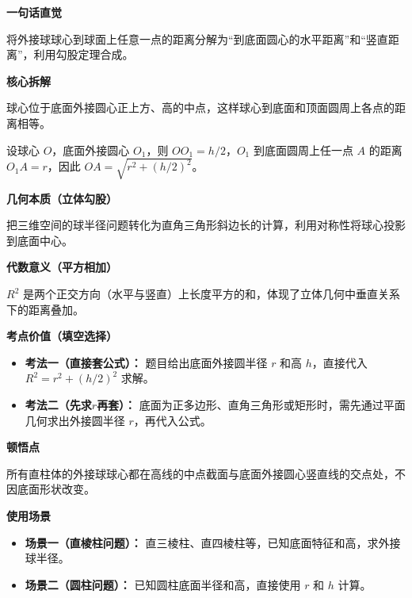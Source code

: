 \begin{explanationbox}
	\textbf{\textcolor{CExplanation}{一句话直觉}}

	将外接球球心到球面上任意一点的距离分解为“到底面圆心的水平距离”和“竖直距离”，利用勾股定理合成。

	\medskip
	\textbf{\textcolor{CExplanation}{核心拆解}}
	\begin{description}[style=nextline, leftmargin=2.8em, labelsep=0.5em, itemsep=0.45em]
		\item[\textbf{要点一（球心定位）：}] 球心位于底面外接圆心正上方、高的中点，这样球心到底面和顶面圆周上各点的距离相等。
		\item[\textbf{要点二（勾股分解）：}] 设球心 $O$，底面外接圆心 $O_1$，则 $OO_1 = h/2$，$O_1$ 到底面圆周上任一点 $A$ 的距离 $O_1 A = r$，因此 $OA = \sqrt{r^2 + (h/2)^2}$。
	\end{description}

	\medskip
	\textbf{\textcolor{CExplanation}{几何本质（立体勾股）}}

	把三维空间的球半径问题转化为直角三角形斜边长的计算，利用对称性将球心投影到底面中心。

	\medskip
	\textbf{\textcolor{CExplanation}{代数意义（平方相加）}}

	$R^2$ 是两个正交方向（水平与竖直）上长度平方的和，体现了立体几何中垂直关系下的距离叠加。

	\medskip
	\textbf{\textcolor{CExplanation}{考点价值（填空选择）}}
	\begin{itemize}[leftmargin=*, itemsep=0.5em, topsep=0.4em]
		\item \textbf{考法一（直接套公式）：} 题目给出底面外接圆半径 $r$ 和高 $h$，直接代入 $R^2 = r^2 + (h/2)^2$ 求解。
		\item \textbf{考法二（先求$r$再套）：} 底面为正多边形、直角三角形或矩形时，需先通过平面几何求出外接圆半径 $r$，再代入公式。
	\end{itemize}

	\medskip
	\textbf{\textcolor{CExplanation}{顿悟点}}

	所有直柱体的外接球球心都在高线的中点截面与底面外接圆心竖直线的交点处，不因底面形状改变。

	\medskip
	\textbf{\textcolor{CExplanation}{使用场景}}
	\begin{itemize}[leftmargin=*, itemsep=0.5em, topsep=0.4em]
		\item \textbf{场景一（直棱柱问题）：} 直三棱柱、直四棱柱等，已知底面特征和高，求外接球半径。
		\item \textbf{场景二（圆柱问题）：} 已知圆柱底面半径和高，直接使用 $r$ 和 $h$ 计算。
	\end{itemize}
\end{explanationbox}

